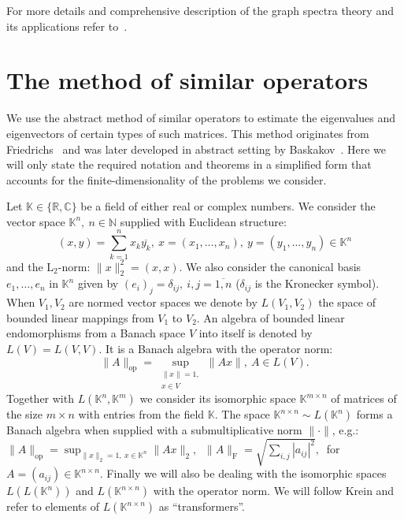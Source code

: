 \documentclass[a4paper]{jpconf}
\begin{document}
For more details and comprehensive description
    of the graph spectra theory
    and its applications
    refer to~\cite{cvetkovic1980spectra,cvetkovic2010introduction,godsil2013algebraic}.

\section{The method of similar operators}

We use the abstract method of similar operators
    to estimate the eigenvalues and eigenvectors
    of certain types of such matrices.
This method originates from Friedrichs~\cite{friedrichs1965advanced}
    and was later developed in abstract setting
    by Baskakov~\cite{baskakov1983methods,baskakov2014memory,baskakov2017method,baskakov2013completeness}.
Here we will only state the required notation and theorems
    in a simplified form that accounts
    for the finite-dimensionality
    of the problems we consider.

Let \( \mathbb{K}\in \{ \mathbb{R}, \mathbb{C} \} \)
    be a field of either real or complex numbers.
We consider the vector space \( \mathbb{K}^n,\ n\in \mathbb{N} \)
    supplied with Euclidean structure:
    \[
        (x, y){=}\sum_{k=1}^n x_k\overline{y_k},
        \ x{=}(x_1,\ldots, x_n),
        \ y=(y_1,\ldots, y_n)
        \in \mathbb{K}^n
        \]
    and the \( \mathrm{L}_2 \)-norm:
    \(
        \|x\|_2^2{=}(x,x).
        \)
We also consider the canonical basis \( e_1, \ldots, e_n \)
    in \( \mathbb{K}^n \) given by
    \( {(e_i)}_j = \delta_{ij},\ i,j=\overline{1,n} \)
    (\(\delta_{ij} \) is the Kronecker symbol).
When \( V_1, V_2 \) are normed vector spaces
    we denote by \( L(V_1, V_2) \)
    the space of bounded linear mappings
    from \( V_1 \) to \( V_2 \).
An algebra of bounded linear endomorphisms
    from a Banach space \( V \)
    into itself
    is denoted by \( L(V) = L(V, V) \).
It is a Banach algebra with the operator norm:
    \[
        \|A\|_{\mathrm{op}} =
        \sup_{
            \substack{\|x\|=1,\\ x\in V}
        } \|A x\|,\ A\in L(V).
        \]
Together with \( L(\mathbb{K}^n, \mathbb{K}^m) \)
    we consider its isomorphic space \( \mathbb{K}^{m{\times}n} \)
    of matrices of the size \( m{\times}n \)
    with entries from the field \( \mathbb{K} \).
The space \( \mathbb{K}^{n{\times}n}\sim L(\mathbb{K}^n) \)
    forms a Banach algebra
    when supplied with a submultiplicative norm
    \( \|\cdot\| \),
    e.g.: \( \|A\|_{\mathrm{op}} = \sup_{\|x\|_2=1,\ x\in \mathbb{K}^n} \|A x\|_2,\ \)
    \( \|A\|_{\mathrm{F}} = \sqrt{\sum_{i,j} |a_{ij}|^2},\ \)
    for 
    \( A{=}(a_{ij})\in\mathbb{K}^{n\times n} \).
Finally we will also be dealing with the isomorphic spaces
    \( L(L(\mathbb{K}^n)) \) and \( L(\mathbb{K}^{n{\times}n}) \)
    with the operator norm.
We will follow Krein
    and refer to elements of \( L(\mathbb{K}^{n{\times}n}) \)
    as ``transformers''.
\end{document}
